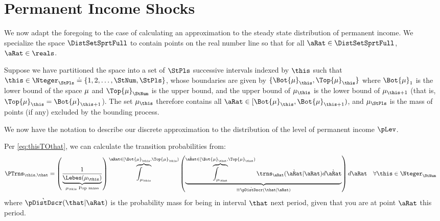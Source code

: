 \documentclass[../BufferStockTheory.tex]{subfiles}\usepackage{ApndxSteadyState}
\begin{document}
    \section{Permanent Income Shocks}

  We now adapt the foregoing to the case of calculating an approximation to the steady state distribution of permanent income. We specialize the space $\DistSetSprtFull$ to contain points on the real number line so that for all $\point \in \DistSetSprtFull$, $\point \in \reals$.

  Suppose we have partitioned the space into a set of $\StPls$ successive intervals indexed by $\this$ such that $\this \in \Nteger_{\StPls} \doteq \{1,2,\dots,\StNum,\StPls\}$, whose boundaries are given by $\{\Bot{\SetSub}_{\this},\Top{\SetSub}_{\this}\}$ where $\Bot{\SetSub}_{1}$ is the lower bound of the space $\mu$ and $\Top{\SetSub}_{\StNum}$ is the upper bound, and the upper bound of $\SetSub_{\this}$ is the lower bound of $\SetSub_{\this+1}$ (that is, $\Top{\SetSub}_{\this}=\Bot{\SetSub}_{\this+1}$).  The set $\SetSub_{\this}$ therefore contains all  $\point \in [\Bot{\SetSub}_{\this},\Bot{\SetSub}_{\this+1})$, and $\SetSub_{\StPls}$ is the mass of points (if any) excluded by the bounding process.
  
  We now have the notation to describe our discrete approximation to the distribution of the level of permanent income $\pLev$.  %



  Per \eqref{eq:thisTOthat}, we can calculate the transition probabilities from:
  \begin{equation}\begin{gathered}\begin{aligned}
    \PTrns_{\this,\that} &= \left(\frac{1}{\underbrace{\Lebes(\SetSub_{\this})}_{\SetSub_{\this}\text{~Pop mass}}}\right)\overbrace{\int_{\SetSub_{\this}}}^{\point\in[\Bot{\SetSub}_{\this},\Top{\SetSub}_{\this})}\left(\underbrace{\overbrace{\int_{\SetSub_{\that}}}^{\Nxt{\point}\in[\Bot{\SetSub}_{\that},\Top{\SetSub}_{\that})}\trns_{\point}(\Nxt{\point}|\point){d\Nxt{\point}}}_{\equiv \Nxt{\pDistDscr}(\that|\point)} \right){d\point}~~~\forall\this\in\Nteger_{\StNum} \label{eq:thispTOthatp}
  \end{aligned}\end{gathered}\end{equation}
  where $\Nxt{\pDistDscr}(\that|\point)$ is the probability mass for being in interval $\that$ next period, given that you are at point $\point$ this period.
\end{document}
